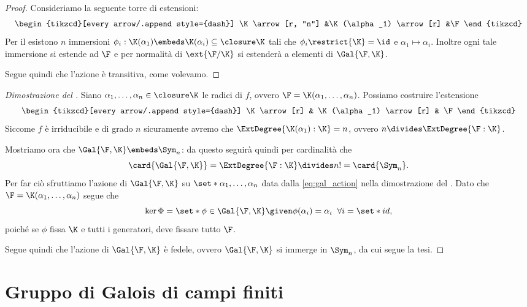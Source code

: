 \begin{proof}
    Consideriamo la seguente torre di estensioni: \[
        \begin{tikzcd}[every arrow/.append style={dash}]
            \K \arrow[r, "n"]
            &\K(\alpha_1) \arrow[r]
            &\F
        \end{tikzcd}
    \] Per il  esistono $n$ immersioni $\phi_i : \K(\alpha_1) \embeds \K(\alpha_i) \subseteq \closure\K$ tali che $\phi_i\restrict{\K} = \id$ e $\alpha_1 \mapsto \alpha_i$. Inoltre ogni tale immersione si estende ad $\F$ e per normalità di $\ext{\F / \K}$ si estenderà a elementi di $\Gal{\F, \K}$.
    
    Segue quindi che l'azione è transitiva, come volevamo.     
\end{proof}

\begin{proof}[Dimostrazione del ]
    Siano $\alpha_1, \dots, \alpha_n \in \closure\K$ le radici di $f$, ovvero $\F = \K(\alpha_1, \dots, \alpha_n)$. Possiamo costruire l'estensione \[
        \begin{tikzcd}[every arrow/.append style={dash}]
            \K \arrow[r]
            & \K(\alpha_1) \arrow[r]
            & \F
        \end{tikzcd}
    \] Siccome $f$ è irriducibile e di grado $n$ sicuramente avremo che $\ExtDegree{\K(\alpha_1) : \K} = n$, ovvero $n \divides \ExtDegree{\F : \K}$.
    
    Mostriamo ora che $\Gal{\F, \K} \embeds \Sym_n$: da questo seguirà quindi per cardinalità che \[
        \card{\Gal{\F, \K}} = \ExtDegree{\F : \K} \divides n! = \card{\Sym_n}.
    \] Per far ciò sfruttiamo l'azione di $\Gal{\F, \K}$ su $\set*{\alpha_1, \dots, \alpha_n}$ data dalla \eqref{eq:gal_action} nella dimostrazione del . Dato che $\F = \K(\alpha_1, \dots, \alpha_n)$ segue che \[
        \ker \Phi = \set*{\phi \in \Gal{\F, \K} \given \phi(\alpha_i) = \alpha_i \;\;\forall i} = \set*{id},
    \] poiché se $\phi$ fissa $\K$ e tutti i generatori, deve fissare tutto $\F$. 
    
    Segue quindi che l'azione di $\Gal{\F, \K}$ è fedele, ovvero $\Gal{\F, \K}$ si immerge in $\Sym_n$, da cui segue la tesi. 
\end{proof}

\section{Gruppo di Galois di campi finiti}

